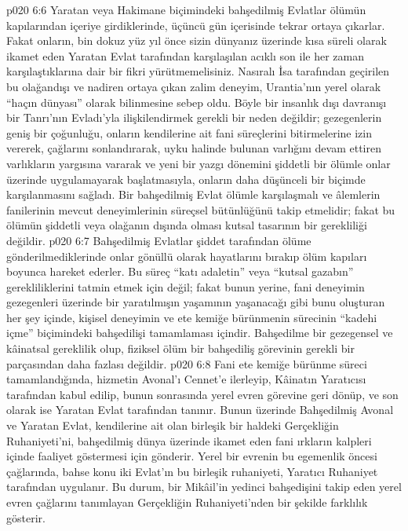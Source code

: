 \vs p020 6:6 Yaratan veya Hakimane biçimindeki bahşedilmiş Evlatlar ölümün kapılarından içeriye girdiklerinde, üçüncü gün içerisinde tekrar ortaya çıkarlar. Fakat onların, bin dokuz yüz yıl önce sizin dünyanız üzerinde kısa süreli olarak ikamet eden Yaratan Evlat tarafından karşılaşılan acıklı son ile her zaman karşılaştıklarına dair bir fikri yürütmemelisiniz. Nasıralı İsa tarafından geçirilen bu olağandışı ve nadiren ortaya çıkan zalim deneyim, Urantia’nın yerel olarak “haçın dünyası” olarak bilinmesine sebep oldu. Böyle bir insanlık dışı davranışı bir Tanrı’nın Evladı’yla ilişkilendirmek gerekli bir neden değildir; gezegenlerin geniş bir çoğunluğu, onların kendilerine ait fani süreçlerini bitirmelerine izin vererek, çağlarını sonlandırarak, uyku halinde bulunan varlığını devam ettiren varlıkların yargısına vararak ve yeni bir yazgı dönemini şiddetli bir ölümle onlar üzerinde uygulamayarak başlatmasıyla, onların daha düşünceli bir biçimde karşılanmasını sağladı. Bir bahşedilmiş Evlat ölümle karşılaşmalı ve âlemlerin fanilerinin mevcut deneyimlerinin süreçsel bütünlüğünü takip etmelidir; fakat bu ölümün şiddetli veya olağanın dışında olması kutsal tasarının bir gerekliliği değildir.
\vs p020 6:7 Bahşedilmiş Evlatlar şiddet tarafından ölüme gönderilmediklerinde onlar gönüllü olarak hayatlarını bırakıp ölüm kapıları boyunca hareket ederler. Bu süreç “katı adaletin” veya “kutsal gazabın” gerekliliklerini tatmin etmek için değil; fakat bunun yerine, fani deneyimin gezegenleri üzerinde bir yaratılmışın yaşamının yaşanacağı gibi bunu oluşturan her şey içinde, kişisel deneyimin ve ete kemiğe bürünmenin sürecinin “kadehi içme” biçimindeki bahşedilişi tamamlaması içindir. Bahşedilme bir gezegensel ve kâinatsal gereklilik olup, fiziksel ölüm bir bahşediliş görevinin gerekli bir parçasından daha fazlası değildir.
\vs p020 6:8 Fani ete kemiğe bürünme süreci tamamlandığında, hizmetin Avonal’ı Cennet’e ilerleyip, Kâinatın Yaratıcısı tarafından kabul edilip, bunun sonrasında yerel evren görevine geri dönüp, ve son olarak ise Yaratan Evlat tarafından tanınır. Bunun üzerinde Bahşedilmiş Avonal ve Yaratan Evlat, kendilerine ait olan birleşik bir haldeki Gerçekliğin Ruhaniyeti’ni, bahşedilmiş dünya üzerinde ikamet eden fani ırkların kalpleri içinde faaliyet göstermesi için gönderir. Yerel bir evrenin bu egemenlik öncesi çağlarında, bahse konu iki Evlat’ın bu birleşik ruhaniyeti, Yaratıcı Ruhaniyet tarafından uygulanır. Bu durum, bir Mikâil’in yedinci bahşedişini takip eden yerel evren çağlarını tanımlayan Gerçekliğin Ruhaniyeti’nden bir şekilde farklılık gösterir.
